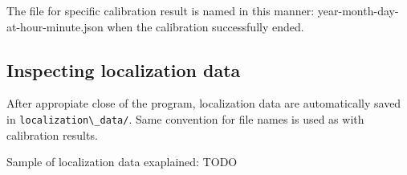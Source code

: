 The file for specific calibration result is named in this manner:
{year}-{month}-{day}-at-{hour}-{minute}.json when the calibration successfully
ended.

\subsection {Inspecting localization data}
After appropiate close of the program, localization data are automatically
saved in \verb+localization\_data/+. Same convention for file names is used as
with calibration results.

Sample of localization data exaplained:
TODO
